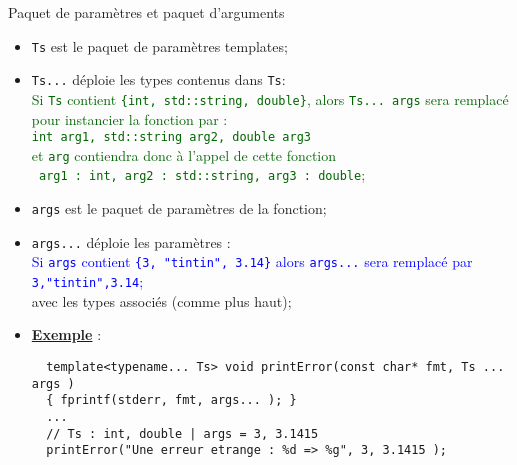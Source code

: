 \documentclass[compress,10pt,aspectratio=169]{beamer}
\begin{document}
\begin{frame}[fragile]{Paquet de paramètres et paquet d'arguments}
  \scriptsize 
  \begin{itemize}
  \item \texttt{Ts} est le paquet de paramètres templates;
  \item \texttt{Ts...} déploie les types contenus dans \texttt{Ts}:\\
  \textcolor{DarkGreen}{
  Si \texttt{Ts} contient \texttt{\{int, std::string, double\}}, alors 
  \texttt{Ts... args} sera remplacé pour instancier la fonction par :\\
  \texttt{int arg1, std::string arg2, double arg3} \\et 
  \texttt{arg} contiendra donc à l'appel de cette fonction \\
  \texttt{ arg1 : int, arg2 : std::string, arg3 : double};
  }
  \item \texttt{args} est le paquet de paramètres de la fonction;
  \item \texttt{args...} déploie les paramètres :\\
  \textcolor{blue}{Si \texttt{args} contient \texttt{\{3, "tintin", 3.14\}} alors 
  \texttt{args...} sera remplacé par \texttt{3,"tintin",3.14};}\\
  avec les types associés (comme plus haut);
  \item \underline{\textcolor{NavyBlue}{\bf Exemple}} :
  \begin{verbatim}
  template<typename... Ts> void printError(const char* fmt, Ts ... args )
  { fprintf(stderr, fmt, args... ); }
  ... 
  // Ts : int, double | args = 3, 3.1415
  printError("Une erreur etrange : %d => %g", 3, 3.1415 );
  \end{verbatim}
  \end{itemize}
  \end{frame}
  
\end{document}
